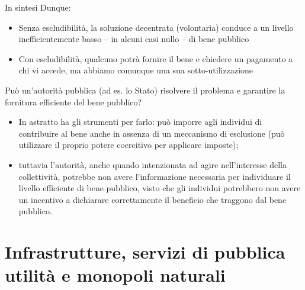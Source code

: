 \documentclass[aspectratio=149,11pt]{beamer}
\begin{document}
\begin{frame}{In sintesi}
Dunque:
\begin{itemize}
\item Senza escludibilità, la soluzione decentrata (volontaria) conduce a un
livello inefficientemente basso -- in alcuni casi nullo -- di bene pubblico
\item Con escludibilità, qualcuno potrà fornire il bene e chiedere un pagamento a
chi vi accede, ma abbiamo comunque una sua sotto-utilizzazione
\end{itemize}
Può un'\alert{autorità pubblica} (ad es. lo Stato) risolvere il problema e garantire la fornitura efficiente del bene pubblico?
\begin{itemize}
\item In astratto ha gli strumenti per farlo: può imporre agli individui di
contribuire al bene anche in assenza di un meccanismo di esclusione (può
utilizzare il proprio potere coercitivo per applicare \alert{imposte});
\item tuttavia l'autorità, anche quando intenzionata ad agire nell'interesse della
collettività, potrebbe non avere l'\alert{informazione} necessaria per individuare
il livello efficiente di bene pubblico, visto che gli individui potrebbero
non avere un incentivo a dichiarare correttamente il beneficio che traggono dal
bene pubblico.
\end{itemize}
\end{frame}


\section{Infrastrutture, servizi di pubblica utilità e monopoli naturali}
\end{document}
